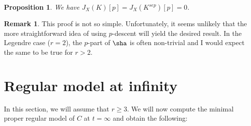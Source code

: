 \documentclass[reqno]{amsart}
\newtheorem{prop}[thm]{Proposition}
\theoremstyle{definition}
\newtheorem{rem}[thm]{Remark}
\theoremstyle{remark}
\begin{document}
\begin{prop}
We have $J_X(K)[p]=J_X(K^{sep})[p]=0$.
\end{prop}

\begin{rem} 
  This proof is not so simple. Unfortunately, it seems
  unlikely that the more straightforward idea of using $p$-descent
  will yield the desired result. In the Legendre case ($r=2$), the
  $p$-part of $\sha$ is often non-trivial and I would expect the same
  to be true for $r>2$. 
\end{rem}













\section{Regular model at infinity}


In this section, we will assume that $r \geq 3$. We will now compute the minimal proper regular model of $C$ at $t = \infty$ and obtain the following:
\end{document}
